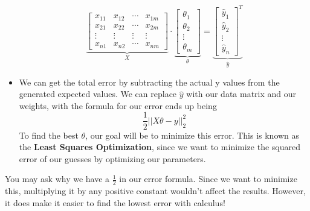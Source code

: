 \documentclass{article}
\begin{document}
\begin{itemize}
    $$\underbrace{\begin{bmatrix}
    x_{11} & x_{12} & \cdots & x_{1m} \\ 
    x_{21} & x_{22} & \cdots & x_{2m} \\ 
    \vdots & \vdots & \vdots & \vdots \\ 
    x_{n1} & x_{n2} & \cdots & x_{nm}
    \end{bmatrix}}_X \cdot \underbrace{\begin{bmatrix}
    \theta_1 \\ \theta_2 \\ \vdots \\ \theta_m
    \end{bmatrix}}_\theta = \underbrace{\begin{bmatrix}
    \hat{y}_1 \\ \hat{y}_2 \\ \vdots \\ \hat{y}_n
    \end{bmatrix}^T}_\hat{y}$$
    
    \item We can get the total error by subtracting the actual y values from the generated expected values. We can replace $\hat{y}$ with our data matrix and our weights, with the formula for our error ends up being 
    $$\frac{1}{2}||X\theta - y||_2^2$$
    To find the best $\theta$, our goal will be to minimize this error. This is known as the \textbf{Least Squares Optimization}, since we want to minimize the squared error of our guesses by optimizing our parameters.
\end{itemize}

You may ask why we have a $\frac{1}{2}$ in our error formula. Since we want to minimize this, multiplying it by any positive constant wouldn't affect the results. However, it does make it easier to find the lowest error with calculus!
\end{document}
